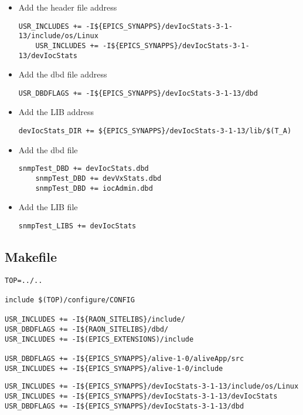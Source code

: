 \documentclass[11pt
  , a4paper
  , article
  , oneside
]{memoir}
\begin{document}
\begin{itemize}
	\item Add the header file address
	\begin{lstlisting}[style=termstyle]
	USR_INCLUDES += -I${EPICS_SYNAPPS}/devIocStats-3-1-13/include/os/Linux
	USR_INCLUDES += -I${EPICS_SYNAPPS}/devIocStats-3-1-13/devIocStats
\end{lstlisting}
	\item Add the dbd file address
	\begin{lstlisting}[style=termstyle]
	USR_DBDFLAGS += -I${EPICS_SYNAPPS}/devIocStats-3-1-13/dbd
\end{lstlisting}
	\item Add the LIB address
	\begin{lstlisting}[style=termstyle]
	devIocStats_DIR += ${EPICS_SYNAPPS}/devIocStats-3-1-13/lib/$(T_A)
\end{lstlisting}
	\item Add the dbd file
	\begin{lstlisting}[style=termstyle]
	snmpTest_DBD += devIocStats.dbd
	snmpTest_DBD += devVxStats.dbd
	snmpTest_DBD += iocAdmin.dbd
\end{lstlisting}
	\item Add the LIB file
	\begin{lstlisting}[style=termstyle]
	snmpTest_LIBS += devIocStats
\end{lstlisting}
\end{itemize}

\subsection{Makefile}
\begin{lstlisting}[style=termstyle]
TOP=../..

include $(TOP)/configure/CONFIG

USR_INCLUDES += -I${RAON_SITELIBS}/include/
USR_DBDFLAGS += -I${RAON_SITELIBS}/dbd/
USR_INCLUDES += -I$(EPICS_EXTENSIONS)/include

USR_DBDFLAGS += -I${EPICS_SYNAPPS}/alive-1-0/aliveApp/src
USR_INCLUDES += -I${EPICS_SYNAPPS}/alive-1-0/include
\end{lstlisting}
\begin{lstlisting}[style=termstyle]
USR_INCLUDES += -I${EPICS_SYNAPPS}/devIocStats-3-1-13/include/os/Linux
USR_INCLUDES += -I${EPICS_SYNAPPS}/devIocStats-3-1-13/devIocStats
USR_DBDFLAGS += -I${EPICS_SYNAPPS}/devIocStats-3-1-13/dbd
\end{lstlisting}
\end{document}
